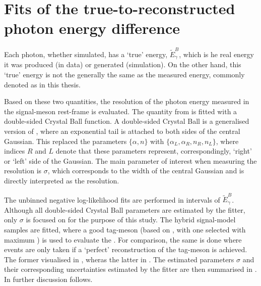 \chapter{Fits of the true-to-reconstructed photon energy difference}\label{sec:appendix_resolution_fits}

Each photon, whether simulated, has a `true' energy, $\tilde{E}_{\gamma}^B$, which is he real energy it was produced (in data) or generated (simulation).
On the other hand, this `true' energy is not the generally the same as the measured energy, commonly denoted as \EB in this thesis.

Based on these two quantities, the resolution of the photon energy measured in the signal-\B meson rest-frame is evaluated.
The quantity from  is fitted with a double-sided Crystal Ball function.
A double-sided Crystal Ball is a generalised version of , where an exponential tail is attached to both sides of the central Gaussian.
This replaced the parameters $\{\alpha,n\}$ with $\{\alpha_L,\alpha_R, n_R, n_L\}$, where indices $R$ and $L$ denote that these parameters represent, correspondingly, `right' or `left' side of the Gaussian.
The main parameter of interest when measuring the resolution is $\sigma$, which corresponds to the width of the central Gaussian and is directly interpreted as the resolution.

The unbinned negative log-likelihood fits are performed in intervals of $\tilde{E}_{\gamma}^B$.
Although all double-sided Crystal Ball parameters are estimated by the fitter, only $\sigma$ is focused on for the purpose of this study.
The hybrid signal-model samples are fitted, where a good tag-\B meson (based on , 
with one selected with maximum \feiProb) is used to evaluate the \EB.
For comparison, the same is done where events are only taken if a `perfect' reconstruction of the tag-\B meson is achieved.
The former visualised in , wheras the latter in .
The estimated parameters $\sigma$ and their corresponding uncertainties estimated by the fitter are then summarised in .
In  further discussion follows.

